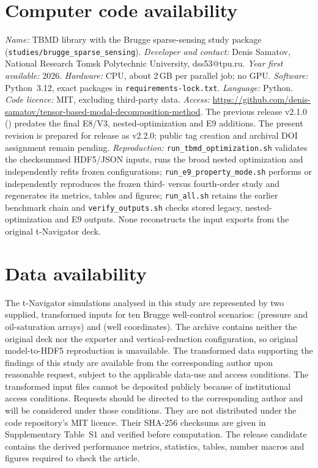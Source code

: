 \section*{Computer code availability}
\label{sec:availability}
\noindent\emph{Name:} TBMD library with the Brugge sparse-sensing study package (\texttt{studies/brugge\_sparse\_sensing}). \emph{Developer and contact:} Denis Samatov, National Research Tomsk Polytechnic University, dss53@tpu.ru. \emph{Year first available:} 2026. \emph{Hardware:} CPU, about 2\,GB per parallel job; no GPU. \emph{Software:} Python~3.12, exact packages in \texttt{requirements-lock.txt}. \emph{Language:} Python. \emph{Code licence:} MIT, excluding third-party data. \emph{Access:} \url{https://github.com/denis-samatov/tensor-based-modal-decomposition-method}. The previous release v2.1.0 (\CodeArchiveDOI{}) predates the final E8/V3, nested-optimization and E9 additions. The present revision is prepared for release as v2.2.0; public tag creation and archival DOI assignment remain pending. \emph{Reproduction:} \texttt{run\_tbmd\_optimization.sh} validates the checksummed HDF5/JSON inputs, runs the broad nested optimization and independently refits frozen configurations; \texttt{run\_e9\_property\_mode.sh} performs or independently reproduces the frozen third- versus fourth-order study and regenerates its metrics, tables and figures; \texttt{run\_all.sh} retains the earlier benchmark chain and \texttt{verify\_outputs.sh} checks stored legacy, nested-optimization and E9 outputs. None reconstructs the input exports from the original t-Navigator deck.

\section*{Data availability}
The t-Navigator simulations analysed in this study are represented by two supplied, transformed inputs for ten Brugge well-control scenarios:  (pressure and oil-saturation arrays) and  (well coordinates). The archive contains neither the original deck nor the exporter and vertical-reduction configuration, so original model-to-HDF5 reproduction is unavailable. The transformed data supporting the findings of this study are available from the corresponding author upon reasonable request, subject to the applicable data-use and access conditions. The transformed input files cannot be deposited publicly because of institutional access conditions. Requests should be directed to the corresponding author and will be considered under those conditions. They are not distributed under the code repository's MIT licence. Their SHA-256 checksums are given in Supplementary Table~S1 and verified before computation. The release candidate contains the derived performance metrics, statistics, tables, number macros and figures required to check the article.


